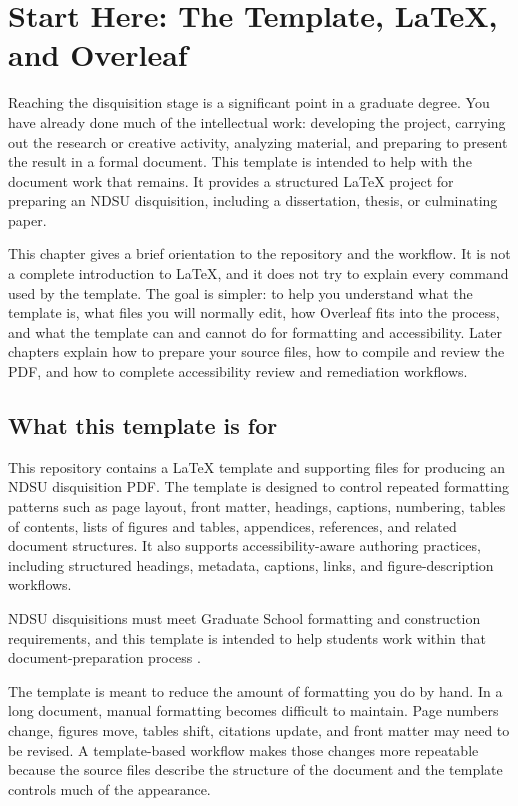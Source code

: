 \chapter{Start Here: The Template, \LaTeX{}, and Overleaf}
\label{chap:start-here}

Reaching the disquisition stage is a significant point in a graduate degree. You have already done much of the intellectual work: developing the project, carrying out the research or creative activity, analyzing material, and preparing to present the result in a formal document. This template is intended to help with the document work that remains. It provides a structured \LaTeX{} project for preparing an NDSU disquisition, including a dissertation, thesis, or culminating paper.

This chapter gives a brief orientation to the repository and the workflow. It is not a complete introduction to \LaTeX{}, and it does not try to explain every command used by the template. The goal is simpler: to help you understand what the template is, what files you will normally edit, how Overleaf fits into the process, and what the template can and cannot do for formatting and accessibility. Later chapters explain how to prepare your source files, how to compile and review the PDF, and how to complete accessibility review and remediation workflows.

\section{What this template is for}
\label{sec:template-purpose}

This repository contains a \LaTeX{} template and supporting files for producing an NDSU disquisition PDF. The template is designed to control repeated formatting patterns such as page layout, front matter, headings, captions, numbering, tables of contents, lists of figures and tables, appendices, references, and related document structures. It also supports accessibility-aware authoring practices, including structured headings, metadata, captions, links, and figure-description workflows.

NDSU disquisitions must meet Graduate School formatting and construction requirements, and this template is intended to help students work within that document-preparation process \parencite{ndsu-cfw-templates-forms}.

The template is meant to reduce the amount of formatting you do by hand. In a long document, manual formatting becomes difficult to maintain. Page numbers change, figures move, tables shift, citations update, and front matter may need to be revised. A template-based workflow makes those changes more repeatable because the source files describe the structure of the document and the template controls much of the appearance.


